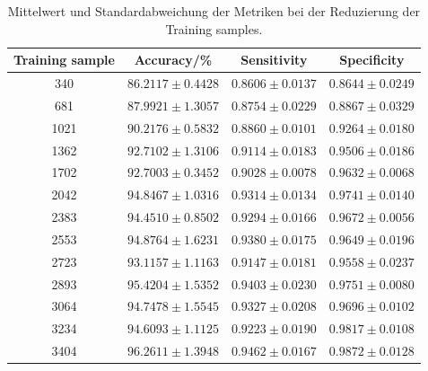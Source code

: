 \begin{table}[H]
    \centering
    {\small
        \begin{tabular}{cccc}
            \toprule
            Training sample & Accuracy/\% & Sensitivity & Specificity\\
            \midrule
            340  & $86.2117 \pm 0.4428$ & $0.8606 \pm 0.0137 $ & $0.8644 \pm 0.0249$\\
            681  & $87.9921 \pm 1.3057$ & $0.8754 \pm 0.0229 $ & $0.8867 \pm 0.0329$\\
            1021 & $90.2176 \pm 0.5832$ & $0.8860 \pm 0.0101 $ & $0.9264 \pm 0.0180$\\
            1362 & $92.7102 \pm 1.3106$ & $0.9114 \pm 0.0183 $ & $0.9506 \pm 0.0186$\\
            1702 & $92.7003 \pm 0.3452$ & $0.9028 \pm 0.0078 $ & $0.9632 \pm 0.0068$\\
            2042 & $94.8467 \pm 1.0316$ & $0.9314 \pm 0.0134 $ & $0.9741 \pm 0.0140$\\
            2383 & $94.4510 \pm 0.8502$ & $0.9294 \pm 0.0166 $ & $0.9672 \pm 0.0056$\\
            2553 & $94.8764 \pm 1.6231$ & $0.9380 \pm 0.0175 $ & $0.9649 \pm 0.0196$\\
            2723 & $93.1157 \pm 1.1163$ & $0.9147 \pm 0.0181 $ & $0.9558 \pm 0.0237$\\
            2893 & $95.4204 \pm 1.5352$ & $0.9403 \pm 0.0230 $ & $0.9751 \pm 0.0080$\\
            3064 & $94.7478 \pm 1.5545$ & $0.9327 \pm 0.0208 $ & $0.9696 \pm 0.0102$\\
            3234 & $94.6093 \pm 1.1125$ & $0.9223 \pm 0.0190 $ & $0.9817 \pm 0.0108$\\
            3404 & $96.2611 \pm 1.3948$ & $0.9462 \pm 0.0167 $ & $0.9872 \pm 0.0128$\\ 
            \bottomrule
        \end{tabular}
    }
  \caption{Mittelwert und Standardabweichung der Metriken bei der Reduzierung der Training samples.}
  \label{tab:reduzierung_trainingsdaten}
\end{table}

